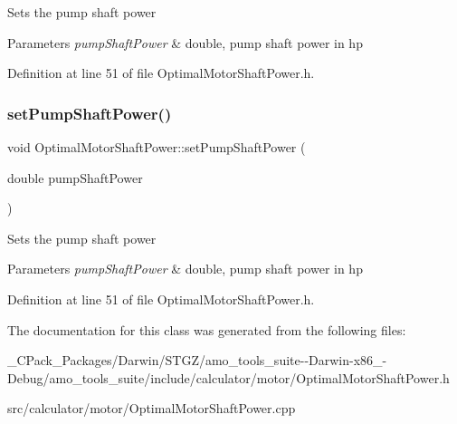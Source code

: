 Sets the pump shaft power 
\begin{DoxyParams}{Parameters}
{\em pump\+Shaft\+Power} & double, pump shaft power in hp \\
\hline
\end{DoxyParams}


Definition at line 51 of file Optimal\+Motor\+Shaft\+Power.\+h.

\mbox{\label{class_optimal_motor_shaft_power_ab2d80927fbaa62705359700b2a8f2f26}} 
\subsubsection{\texorpdfstring{set\+Pump\+Shaft\+Power()}{setPumpShaftPower()}\hspace{0.1cm}{\footnotesize\ttfamily [3/3]}}
{\footnotesize\ttfamily void Optimal\+Motor\+Shaft\+Power\+::set\+Pump\+Shaft\+Power (\begin{DoxyParamCaption}\item[{double}]{pump\+Shaft\+Power }\end{DoxyParamCaption})\hspace{0.3cm}{\ttfamily [inline]}}

Sets the pump shaft power 
\begin{DoxyParams}{Parameters}
{\em pump\+Shaft\+Power} & double, pump shaft power in hp \\
\hline
\end{DoxyParams}


Definition at line 51 of file Optimal\+Motor\+Shaft\+Power.\+h.



The documentation for this class was generated from the following files\+:\begin{DoxyCompactItemize}
\item 
\+\_\+\+C\+Pack\+\_\+\+Packages/\+Darwin/\+S\+T\+G\+Z/amo\+\_\+tools\+\_\+suite-\/-\/\+Darwin-\/x86\+\_-\/\+Debug/amo\+\_\+tools\+\_\+suite/include/calculator/motor/Optimal\+Motor\+Shaft\+Power.\+h\item 
src/calculator/motor/Optimal\+Motor\+Shaft\+Power.\+cpp\end{DoxyCompactItemize}
